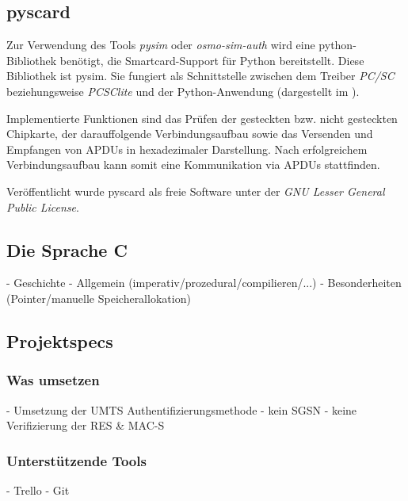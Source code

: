 \subsection{pyscard}
Zur Verwendung des Tools \textit{pysim} oder \textit{osmo-sim-auth} wird eine python-Bibliothek benötigt,
die Smartcard-Support für Python bereitstellt. Diese Bibliothek
ist pysim. Sie fungiert als Schnittstelle zwischen dem Treiber \textit{PC/SC}
beziehungsweise \textit{PCSClite} und der Python-Anwendung 
(dargestellt im ).

Implementierte Funktionen sind das Prüfen der gesteckten bzw. nicht gesteckten
Chipkarte, der darauffolgende Verbindungsaufbau sowie das Versenden und
Empfangen von APDUs in hexadezimaler Darstellung.
Nach erfolgreichem Verbindungsaufbau kann somit eine Kommunikation via
APDUs stattfinden.

Veröffentlicht wurde pyscard als freie Software unter der
\textit{GNU Lesser General Public License}.


\subsection{Die Sprache C}
- Geschichte
- Allgemein (imperativ/prozedural/compilieren/...)
- Besonderheiten (Pointer/manuelle Speicherallokation)

\subsection{Projektspecs}
 \subsubsection{Was umsetzen}
- Umsetzung der UMTS Authentifizierungsmethode
- kein SGSN
- keine Verifizierung der RES \& MAC-S

 \subsubsection{Unterstützende Tools}
 - Trello
 - Git